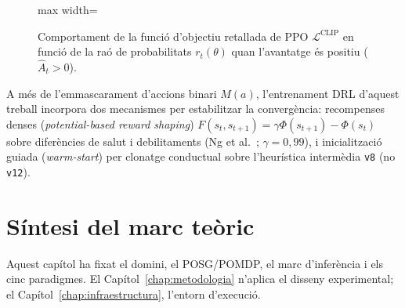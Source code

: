 \begin{figure}[htbp]
    \centering
    \begin{adjustbox}{max width=\linewidth}
    \end{adjustbox}
    \caption{Comportament de la funció d'objectiu retallada de PPO $\mathcal{L}^{\mathrm{CLIP}}$ en funció de la raó de probabilitats $r_t(\theta)$ quan l'avantatge és positiu ($\hat{A}_t > 0$).}
    \label{fig:ppo_clip}
\end{figure}

A més de l'emmascarament d'accions binari $M(a)$, l'entrenament DRL d'aquest treball incorpora dos mecanismes per estabilitzar la convergència: recompenses denses (\emph{potential-based reward shaping}) $F(s_t,s_{t+1})=\gamma\Phi(s_{t+1})-\Phi(s_t)$ sobre diferències de salut i debilitaments (Ng et al.~\cite{ng_reward_shaping}; $\gamma=0{,}99$), i inicialització guiada (\emph{warm-start}) per clonatge conductual sobre l'heurística intermèdia \texttt{v8} (no \texttt{v12}).

\section{Síntesi del marc teòric}
\label{sec:marc_teoric_sintesi}

Aquest capítol ha fixat el domini, el POSG/POMDP, el marc d'inferència i els cinc paradigmes. El Capítol~\ref{chap:metodologia} n'aplica el disseny experimental; el Capítol~\ref{chap:infraestructura}, l'entorn d'execució.



